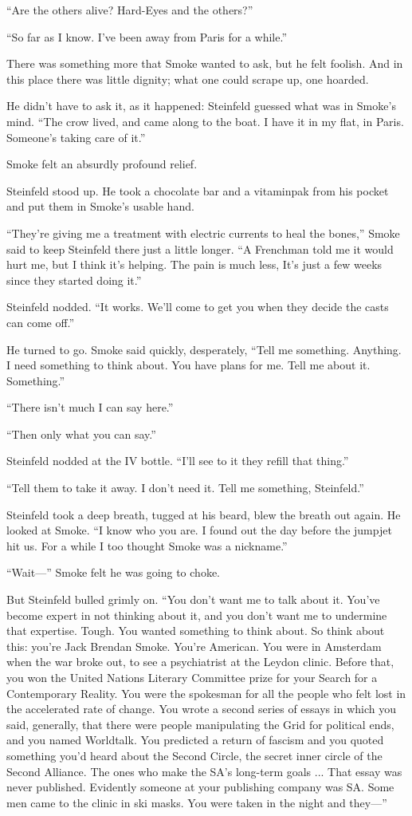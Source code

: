``Are the others alive? Hard-Eyes and the others?''

``So far as I know. I've been away from Paris for a while.''

There was something more that Smoke wanted to ask, but he felt foolish. And in this place there was little dignity; what one could scrape up, one hoarded.

He didn't have to ask it, as it happened: Steinfeld guessed what was in Smoke's mind. ``The crow lived, and came along to the boat. I have it in my flat, in Paris. Someone's taking care of it.''

Smoke felt an absurdly profound relief.

Steinfeld stood up. He took a chocolate bar and a vitaminpak from his pocket and put them in Smoke's usable hand.

``They're giving me a treatment with electric currents to heal the bones,'' Smoke said to keep Steinfeld there just a little longer. ``A Frenchman told me it would hurt me, but I think it's helping. The pain is much less, It's just a few weeks since they started doing it.''

Steinfeld nodded. ``It works. We'll come to get you when they decide the casts can come off.''

He turned to go. Smoke said quickly, desperately, ``Tell me something. Anything. I need something to think about. You have plans for me. Tell me about it. Something.''

``There isn't much I can say here.''

``Then only what you can say.''

Steinfeld nodded at the IV bottle. ``I'll see to it they refill that thing.''

``Tell them to take it away. I don't need it. Tell me something, Steinfeld.''

Steinfeld took a deep breath, tugged at his beard, blew the breath out again. He looked at Smoke. ``I know who you are. I found out the day before the jumpjet hit us. For a while I too thought Smoke was a nickname.''

``Wait—'' Smoke felt he was going to choke.

But Steinfeld bulled grimly on. ``You don't want me to talk about it. You've become expert in not thinking about it, and you don't want me to undermine that expertise. Tough. You wanted something to think about. So think about this: you're Jack Brendan Smoke. You're American. You were in Amsterdam when the war broke out, to see a psychiatrist at the Leydon clinic. Before that, you won the United Nations Literary Committee prize for your Search for a Contemporary Reality. You were the spokesman for all the people who felt lost in the accelerated rate of change. You wrote a second series of essays in which you said, generally, that there were people manipulating the Grid for political ends, and you named Worldtalk. You predicted a return of fascism and you quoted something you'd heard about the Second Circle, the secret inner circle of the Second Alliance. The ones who make the SA's long-term goals ... That essay was never published. Evidently someone at your publishing company was SA. Some men came to the clinic in ski masks. You were taken in the night and they—''

